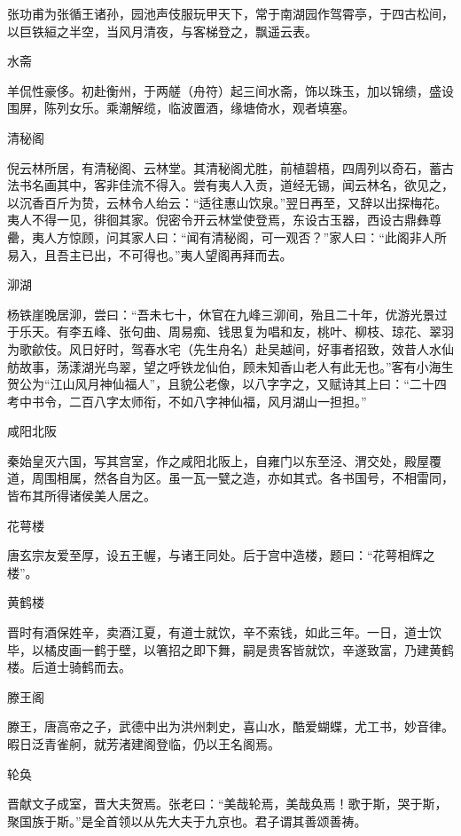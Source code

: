 \documentclass[a4paper,12pt,UTF8,twoside]{ctexbook}
\begin{document}
    张功甫为张循王诸孙，园池声伎服玩甲天下，常于南湖园作驾霄亭，于四古松间，以巨铁絙之半空，当风月清夜，与客梯登之，飘遥云表。
    
    水斋
    
    羊侃性豪侈。初赴衡州，于两艖（舟符）起三间水斋，饰以珠玉，加以锦缋，盛设围屏，陈列女乐。乘潮解缆，临波置酒，缘塘倚水，观者填塞。
    
    清秘阁
    
    倪云林所居，有清秘阁、云林堂。其清秘阁尤胜，前植碧梧，四周列以奇石，蓄古法书名画其中，客非佳流不得入。尝有夷人入贡，道经无锡，闻云林名，欲见之，以沉香百斤为贽，云林令人绐云：“适往惠山饮泉。”翌日再至，又辞以出探梅花。夷人不得一见，徘徊其家。倪密令开云林堂使登焉，东设古玉器，西设古鼎彝尊罍，夷人方惊顾，问其家人曰：“闻有清秘阁，可一观否？”家人曰：“此阁非人所易入，且吾主已出，不可得也。”夷人望阁再拜而去。
    
    泖湖
    
    杨铁崖晚居泖，尝曰：“吾未七十，休官在九峰三泖间，殆且二十年，优游光景过于乐天。有李五峰、张句曲、周易痴、钱思复为唱和友，桃叶、柳枝、琼花、翠羽为歌歈伎。风日好时，驾春水宅（先生舟名）赴吴越间，好事者招致，效昔人水仙舫故事，荡漾湖光鸟翠，望之呼铁龙仙伯，顾未知香山老人有此无也。”客有小海生贺公为“江山风月神仙福人”，且貌公老像，以八字字之，又赋诗其上曰：“二十四考中书令，二百八字太师衔，不如八字神仙福，风月湖山一担担。”
    
    咸阳北阪
    
    秦始皇灭六国，写其宫室，作之咸阳北阪上，自雍门以东至泾、渭交处，殿屋覆道，周围相属，然各自为区。虽一瓦一甓之造，亦如其式。各书国号，不相雷同，皆布其所得诸侯美人居之。
    
    花萼楼
    
    唐玄宗友爱至厚，设五王幄，与诸王同处。后于宫中造楼，题曰：“花萼相辉之楼”。
    
    黄鹤楼
    
    晋时有酒保姓辛，卖酒江夏，有道士就饮，辛不索钱，如此三年。一日，道士饮毕，以橘皮画一鹤于壁，以箸招之即下舞，嗣是贵客皆就饮，辛遂致富，乃建黄鹤楼。后道士骑鹤而去。
    
    滕王阁
    
    滕王，唐高帝之子，武德中出为洪州刺史，喜山水，酷爱蝴蝶，尤工书，妙音律。暇日泛青雀舸，就芳渚建阁登临，仍以王名阁焉。
    
    轮奂
    
    晋献文子成室，晋大夫贺焉。张老曰：“美哉轮焉，美哉奂焉！歌于斯，哭于斯，聚国族于斯。”是全首领以从先大夫于九京也。君子谓其善颂善祷。
    
\end{document}
